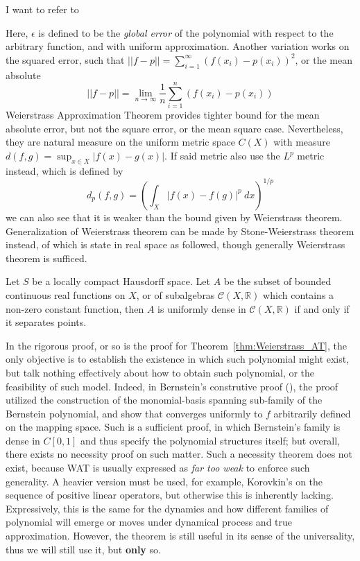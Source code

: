 \documentclass[
  journal=largetwo,
  year=2025,
  volume=37,
]{cup-journal}
\begin{document}
I want to refer to \cite{molnar2020general}

Here, $\epsilon$ is defined to be the \textit{global error} of the polynomial with respect to the arbitrary function, and with uniform approximation. Another variation works on the squared error, such that $||f-p||=\sum_{i=1}^{\infty}(f(x_{i})-p(x_{i}))^{2}$, or the mean absolute $$||f-p||=\lim_{n\to\infty}\frac{1}{n}\sum_{i=1}^{n}(f(x_{i})-p(x_{i}))$$
Weierstrass Approximation Theorem provides tighter bound for the mean absolute error, but not the square error, or the mean square case. Nevertheless, they are natural measure on the uniform metric space $C(X)$ with measure $d(f,g)=\sup_{x\in X}|f(x)-g(x)|$. If said metric also use the $L^{p}$ metric instead, which is defined by 
\begin{equation}
    d_{p}(f,g) = \left(\int_{X}|f(x)-f(g)|^{p}\:dx\right)^{1/p}
\end{equation}
we can also see that it is weaker than the bound given by Weierstrass theorem. Generalization of Weierstrass theorem can be made by Stone-Weierstrass theorem instead, of which is state in real space as followed, though generally Weierstrass theorem is sufficed.
\begin{theorem}
  Let $S$ be a locally compact Hausdorff space. Let $A$ be the subset of bounded continuous real functions on $X$, or of subalgebras $\mathcal{C}(X,\mathbb{R})$ which contains a non-zero constant function, then $A$ is uniformly dense in $\mathcal{C}(X,\mathbb{R})$ if and only if it separates points. 
\end{theorem}

In the rigorous proof, or so is the proof for Theorem~\ref{thm:Weierstrass_AT}, the only objective is to establish the existence in which such polynomial might exist, but talk nothing effectively about how to obtain such polynomial, or the feasibility of such model. Indeed, in Bernstein's construtive proof (\cite{sury2019weierstrass,bernsprob2023}), the proof utilized the construction of the monomial-basis spanning sub-family of the Bernstein polynomial, and show that converges uniformly to $f$ arbitrarily defined on the mapping space. Such is a sufficient proof, in which Bernstein's family is dense in $C[0,1]$ and thus specify the polynomial structures itself; but overall, there exists no necessity proof on such matter. Such a necessity theorem does not exist, because WAT is usually expressed as \textit{far too weak} to enforce such generality. A heavier version must be used, for example, Korovkin's on the sequence of positive linear operators, but otherwise this is inherently lacking. Expressively, this is the same for the dynamics and how different families of polynomial will emerge or moves under dynamical process and true approximation. However, the theorem is still useful in its sense of the universality, thus we will still use it, but \textbf{only} so. 
\end{document}
